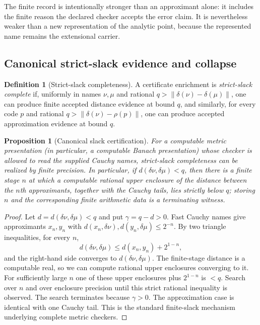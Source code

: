 \documentclass[11pt]{article}
\newtheorem{proposition}[theorem]{Proposition}
\theoremstyle{definition}
\newtheorem{definition}[theorem]{Definition}
\newcommand{\norm}[1]{\left\lVert #1 \right\rVert}
\begin{document}
The finite record is intentionally stronger than an approximant alone: it includes the
finite reason the declared checker accepts the error claim.  It is nevertheless weaker
than a new representation of the analytic point, because the represented name remains the
extensional carrier.

\subsection{Canonical strict-slack evidence and collapse}

\begin{definition}[Strict-slack completeness]\label{def:slackcomplete}
A certificate enrichment is \emph{strict-slack complete} if, uniformly in names $\nu,\mu$
and rational $q>\norm{\delta(\nu)-\delta(\mu)}$, one can produce finite accepted distance
evidence at bound $q$, and similarly, for every code $p$ and rational
$q>\norm{\delta(\nu)-\rho(p)}$, one can produce accepted approximation evidence at bound
$q$.
\end{definition}

\begin{proposition}[Canonical slack certification]\label{prop:slack}
For a computable metric presentation (in particular, a computable Banach presentation) whose checker is allowed to read the supplied
Cauchy names, strict-slack completeness can be realized by finite precision.  In
particular, if $d(\delta\nu,\delta\mu)<q$, then there is a finite stage $n$ at which a
computable rational upper enclosure of the distance between the $n$th approximants,
together with the Cauchy tails, lies strictly below $q$; storing $n$ and the corresponding
finite arithmetic data is a terminating witness.
\end{proposition}

\begin{proof}
Let $d=d(\delta\nu,\delta\mu)<q$ and put $\gamma=q-d>0$.  Fast Cauchy names give
approximants $x_n,y_n$ with $d(x_n,\delta\nu),d(y_n,\delta\mu)\le2^{-n}$.  By two triangle inequalities, for every $n$,
\[
 d(\delta\nu,\delta\mu)\le d(x_n,y_n)+2^{1-n},
\]
and the right-hand side converges to $d(\delta\nu,\delta\mu)$.
The finite-stage distance is a computable real, so we can compute rational upper
enclosures converging to it.  For sufficiently large $n$ one of these upper enclosures
plus $2^{1-n}$ is $<q$.  Search over $n$ and over enclosure precision until this strict
rational inequality is observed.  The search terminates because $\gamma>0$.  The
approximation case is identical with one Cauchy tail.  This is the standard finite-slack
mechanism underlying complete metric checkers.
\end{proof}
\end{document}
